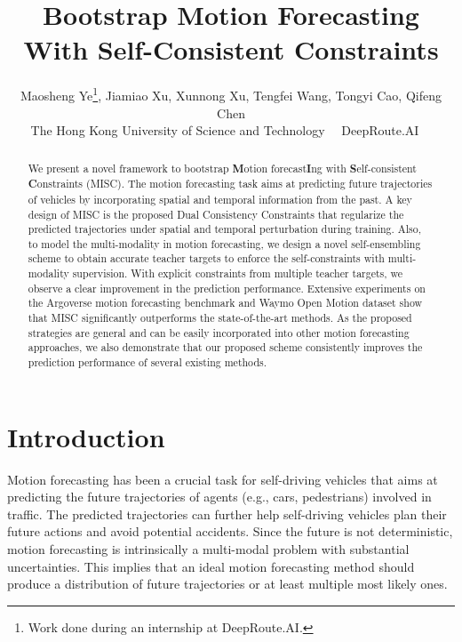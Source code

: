 \documentclass[10pt,twocolumn,letterpaper]{article}
\begin{document}
\title{Bootstrap Motion Forecasting With Self-Consistent Constraints}



\author{
Maosheng Ye\thanks{Work done during an internship at DeepRoute.AI.},
Jiamiao Xu, Xunnong Xu, Tengfei Wang, Tongyi Cao, Qifeng Chen
\\ [0.25cm]
The Hong Kong University of Science and Technology~~
DeepRoute.AI~~
}
\maketitle
\ificcvfinal\thispagestyle{empty}\fi


\begin{abstract}
   We present a novel framework to bootstrap \textbf{M}otion forecast\textbf{I}ng with \textbf{S}elf-consistent \textbf{C}onstraints (MISC). The motion forecasting task aims at predicting future trajectories of vehicles by incorporating spatial and temporal information from the past. A key design of MISC is the proposed Dual Consistency Constraints that regularize the predicted trajectories under spatial and temporal perturbation during training. Also, to model the multi-modality in motion forecasting,  we design a novel self-ensembling scheme to obtain accurate teacher targets to enforce the self-constraints with multi-modality supervision. With explicit constraints from multiple teacher targets, we observe a clear improvement in the prediction performance. Extensive experiments on the Argoverse motion forecasting benchmark and Waymo Open Motion dataset show that MISC significantly outperforms the state-of-the-art methods. As the proposed strategies are general and can be easily incorporated into other motion forecasting approaches, we also demonstrate that our proposed scheme consistently improves the prediction performance of several existing methods.
\end{abstract}

\section{Introduction}

Motion forecasting has been a crucial task for self-driving vehicles that aims at predicting the future trajectories of agents (e.g., cars, pedestrians) involved in traffic. The predicted trajectories can further help self-driving vehicles plan their future actions and avoid potential accidents. Since the future is not deterministic, motion forecasting is intrinsically a multi-modal problem with substantial uncertainties. This implies that an ideal motion forecasting method should produce a distribution of future trajectories or at least multiple most likely ones. 
\end{document}
